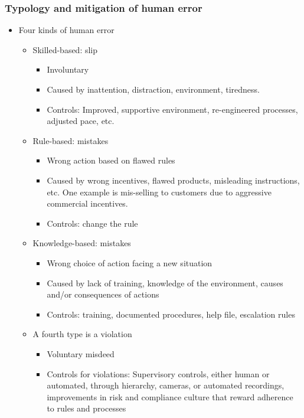 \subsubsection{Typology and mitigation of human error}
\begin{itemize}
\item  Four kinds of human error
    \begin{itemize}
    \item Skilled-based: slip
        \begin{itemize}
        \item Involuntary
        \item  Caused by inattention, distraction, environment, tiredness.
        \item  Controls: Improved, supportive environment, re-engineered processes, adjusted pace, etc.
        \end{itemize}
    \item Rule-based: mistakes
        \begin{itemize}
        \item Wrong action based on flawed rules
        \item  Caused by wrong incentives, flawed products, misleading instructions, etc. One example is mis-selling to customers due to aggressive commercial incentives.
        \item  Controls: change the rule
        \end{itemize}
    \item Knowledge-based: mistakes
        \begin{itemize}
        \item Wrong choice of action facing a new situation
        \item  Caused by lack of training, knowledge of the environment, causes and/or consequences of actions
        \item  Controls: training, documented procedures, help file, escalation rules
        \end{itemize}

    \item A fourth type is a violation
        \begin{itemize}
        \item Voluntary misdeed
        \item  Controls for violations: Supervisory controls, either human or automated, through hierarchy, cameras, or automated recordings, improvements in risk and compliance culture that reward adherence to rules and processes
        
        \end{itemize}
    \end{itemize}
    
\end{itemize}



